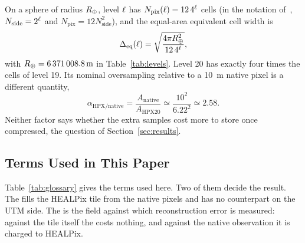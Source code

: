 On a sphere of radius $R_{\oplus}$, level $\ell$ has
$N_{\mathrm{pix}}(\ell) = 12\,4^{\ell}$ cells (in the notation
of~\cite{gorski2005healpix}, $N_{\mathrm{side}}=2^{\ell}$ and
$N_{\mathrm{pix}}=12N_{\mathrm{side}}^2$), and the equal-area
equivalent cell width is
\begin{equation}
\Delta_{\mathrm{eq}}(\ell) = \sqrt{\frac{4\pi R_{\oplus}^2}{12\,4^{\ell}}},
\label{eq:healpix_width}
\end{equation}
with $R_{\oplus}=\SI{6371008.8}{m}$ in Table~\ref{tab:levels}. Level 20 has
exactly four times the cells of level 19. Its nominal oversampling
relative to a \SI{10}{m} native pixel is a different quantity,
\begin{equation}
\alpha_{\mathrm{HPX/native}} = \frac{A_{\mathrm{native}}}{A_{\mathrm{HPX20}}} \simeq \frac{10^2}{6.22^2} \simeq 2.58.
\label{eq:alpha}
\end{equation}
Neither factor says whether the extra samples cost more to store once
compressed, the question of Section~\ref{sec:results}.

\subsection{Terms Used in This Paper}
\label{sec:glossary}
Table~\ref{tab:glossary} gives the terms used here. Two of them decide the result. The
 fills the HEALPix tile from the native pixels and has
no counterpart on the UTM side. The  is the field
against which reconstruction error is measured: against the tile itself
the  costs nothing, and against the native observation it is
charged to HEALPix.

